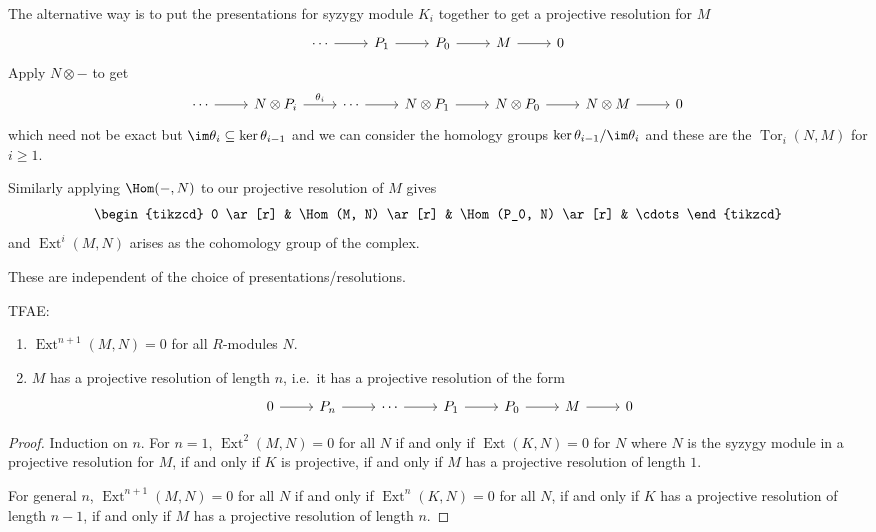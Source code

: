 \documentclass[a4paper]{article}
\DeclareMathOperator{\Tor}{Tor}
\DeclareMathOperator{\Ext}{Ext}
\begin{document}
The alternative way is to put the presentations for syzygy module \(K_i\) together to get a projective resolution for \(M\)
\[
  \begin{tikzcd}
    \cdots \ar[r] & P_1 \ar[r] & P_0 \ar[r] & M \ar[r] & 0
  \end{tikzcd}
\]
Apply \(N \otimes -\) to get
\[
  \begin{tikzcd}
    \cdots \ar[r] & N \otimes P_i \ar[r, "\theta_i"] & \cdots \ar[r] & N \otimes P_1 \ar[r] & N \otimes P_0 \ar[r] & N \otimes M \ar[r] & 0
  \end{tikzcd}
\]
which need not be exact but \(\im \theta_i \subseteq \ker \theta_{i - 1}\) and we can consider the homology groups \(\ker \theta_{i - 1}/\im \theta_i\) and these  are the \(\Tor_i(N, M)\) for \(i \geq 1\).

Similarly applying \(\Hom(-, N)\) to our projective resolution of \(M\) gives
\[
  \begin{tikzcd}
    0 \ar[r] & \Hom(M, N) \ar[r] & \Hom(P_0, N) \ar[r] & \cdots
  \end{tikzcd}
\]
and \(\Ext^i(M, N)\) arises as the cohomology group of the complex.

\begin{remark}
  These are independent of the choice of presentations/resolutions.
\end{remark}

\begin{lemma}
  TFAE:
  \begin{enumerate}
  \item \(\Ext^{n + 1}(M, N) = 0\) for all \(R\)-modules \(N\).
  \item \(M\) has a projective resolution of length \(n\), i.e.\ it has a projective resolution of the form
    \[
      \begin{tikzcd}
        0 \ar[r] & P_n \ar[r] & \cdots \ar[r] & P_1 \ar[r] & P_0 \ar[r] & M \ar[r] & 0
      \end{tikzcd}
    \]
  \end{enumerate}
\end{lemma}

\begin{proof}
  Induction on \(n\). For \(n = 1\), \(\Ext^2(M, N) = 0\) for all \(N\) if and only if \(\Ext(K, N) = 0\) for \(N\) where \(N\) is the syzygy module in a projective resolution for \(M\), if and only if \(K\) is projective, if and only if \(M\) has a projective resolution of length \(1\).

  For general \(n\), \(\Ext^{n + 1}(M, N) = 0\) for all \(N\) if and only if \(\Ext^n(K, N) = 0\) for all \(N\), if and only if \(K\) has a projective resolution of length \(n - 1\), if and only if \(M\) has a projective resolution of length \(n\).
\end{proof}
\end{document}
